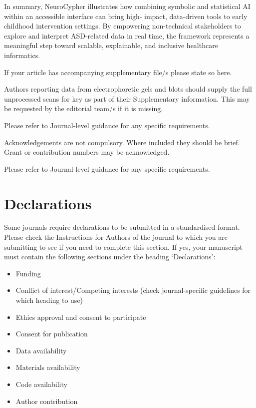 \documentclass[pdflatex,sn-basic]{sn-jnl}%
\theoremstyle{thmstyleone}%
\theoremstyle{thmstyletwo}%
\theoremstyle{thmstylethree}%
\begin{document}
  In summary, NeuroCypher illustrates how combining symbolic and statistical AI within an accessible interface can bring high-
  impact, data-driven tools to early childhood intervention settings. By empowering non-technical stakeholders to explore and
  interpret ASD-related data in real time, the framework represents a meaningful step toward scalable, explainable, and inclusive
  healthcare informatics.



  \backmatter


  If your article has accompanying supplementary file/s please state so here.

  Authors reporting data from electrophoretic gels and blots should supply the full unprocessed scans for key as part of their
  Supplementary information. This may be requested by the editorial team/s if it is missing.

  Please refer to Journal-level guidance for any specific requirements.


  Acknowledgements are not compulsory. Where included they should be brief. Grant or contribution numbers may be acknowledged.

  Please refer to Journal-level guidance for any specific requirements.


  

  \section*{Declarations}

  Some journals require declarations to be submitted in a standardised format. Please check the Instructions for Authors of the
  journal to which you are submitting to see if you need to complete this section. If yes, your manuscript must contain the
  following sections under the heading `Declarations':

  \begin{itemize}
  \item Funding
  \item Conflict of interest/Competing interests (check journal-specific guidelines for which heading to use)
  \item Ethics approval and consent to participate
  \item Consent for publication
  \item Data availability
  \item Materials availability
  \item Code availability
  \item Author contribution
  \end{itemize}
\end{document}
